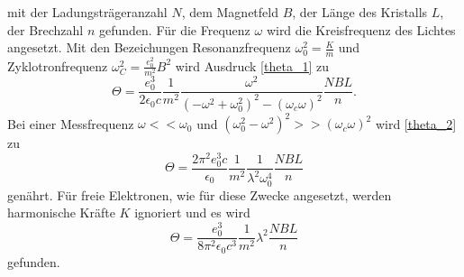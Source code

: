 mit der Ladungsträgeranzahl $N$, dem Magnetfeld $B$, der Länge des Kristalls $L$, der Brechzahl $n$ gefunden.
Für die Frequenz $\omega$ wird die Kreisfrequenz des Lichtes angesetzt.
Mit den Bezeichungen Resonanzfrequenz $\omega_0^2 =\frac{K}{m}$ und Zyklotronfrequenz $\omega_C^2 =\frac{e_0^2}{m^2} B^2$ wird Ausdruck \eqref{theta_1} zu
\begin{equation}
    \Theta = \frac{e_0^3}{2\epsilon_0 c}\frac{1}{m^2} \frac{\omega^2}{(-\omega^2+\omega_0^2)^2-(\omega_c\omega)^2} \frac{NBL}{n}.
    \label{theta_2}
\end{equation}
Bei einer Messfrequenz $\omega << \omega_0$ und $(\omega_0^2-\omega^2)^2>>(\omega_c\omega)^2$ wird \eqref{theta_2} zu
\begin{equation}
    \Theta = \frac{2\pi^2 e_0^3 c}{\epsilon_0} \frac{1}{m^2} \frac{1}{\lambda^2\omega_0^4} \frac{NBL}{n}
\end{equation}
genährt.
Für freie Elektronen, wie für diese Zwecke angesetzt, werden harmonische Kräfte $K$ ignoriert und es wird
\begin{equation}
    \Theta = \frac{e_0^3}{8\pi^2\epsilon_0 c^3} \frac{1}{m^2} \lambda^2 \frac{NBL}{n}
\end{equation}
gefunden.
